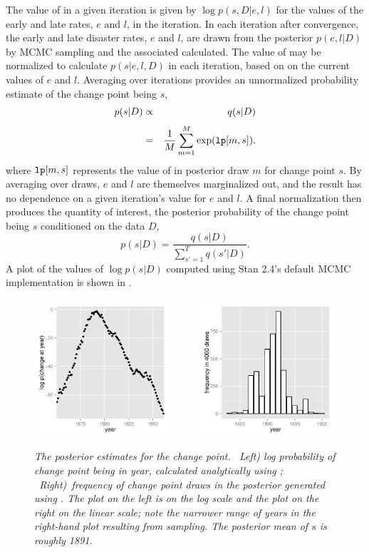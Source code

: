 The value of  in a given iteration is given by $\log
p(s,D|e,l)$ for the values of the early and late rates, $e$ and $l$,
in the iteration.  In each iteration after convergence, the early and
late disaster rates, $e$ and $l$, are drawn from the posterior
$p(e,l|D)$ by MCMC sampling and the associated  calculated.
The value of  may be normalized to calculate $p(s|e,l,D)$ in
each iteration, based on on the current values of $e$ and $l$.
Averaging over iterations provides an unnormalized probability
estimate of the change point being $s$,
%
\begin{eqnarray*}
p(s | D)
& \propto &
q(s | D)
\\[3pt]
& = & 
\frac{1}{M} \sum_{m=1}^{M} \exp(\code{lp}[m,s]).
\end{eqnarray*}
%
where $\mbox{\code{lp}}[m,s]$ represents the value of  in
posterior draw $m$ for change point $s$.  By averaging over draws,
$e$ and $l$ are themselves marginalized out, and the result has no
dependence on a given iteration's value for $e$ and $l$.  A final
normalization then produces the quantity of interest, the posterior
probability of the change point being $s$ conditioned on the data $D$,
%
\[
p(s | D)
=
\frac{q(s|D)}{\sum_{s'=1}^T q(s' | D)}.
\]
%
A plot of the values of $\log p(s|D)$ computed using Stan 2.4's
default MCMC implementation is shown in
.
%
\begin{figure}
\begin{center}
\includegraphics[height=2in]{img/change-point-posterior.pdf}
\ \ \ \ \
\includegraphics[height=2in]{img/s-discrete-posterior.pdf}
\end{center}
\vspace*{-12pt}
\caption{\small\it The posterior estimates for the change point.  \
  {\rm Left)} log probability of change point being in year,
  calculated analytically using ; \ {\rm Right)}\ frequency
  of change point draws in the posterior generated using
  \code{lp}. The plot on the left is on the log scale and the plot on
  the right on the linear scale; note the narrower range of years in
  the right-hand plot resulting from sampling. The posterior mean of
  $s$ is roughly 1891.}%
\label{change-point-posterior.figure}
\end{figure}
